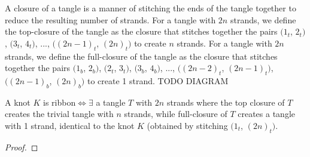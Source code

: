 \begin{paper}
A closure of a tangle is a manner of stitching the ends of the tangle together
to reduce the resulting number of strands.
For a tangle with $2n$ strands, we define the top-closure of the tangle as the
closure that stitches together the pairs $(1_t$, $2_t)$, $(3_t$, $4_t)$, ...,
$((2n-1)_t$, $(2n)_t)$ to create $n$ strands.
For a tangle with $2n$ strands, we define the full-closure of the tangle as the
closure that stitches together the pairs $(1_b$, $2_b)$, $(2_t$, $3_t)$, $(3_b$,
$4_b)$, ..., $((2n-2)_t$, $(2n-1)_t)$, $((2n-1)_b$, $(2n)_b)$ to create 1
strand.
TODO DIAGRAM
\begin{theorem}
A knot $K$ is ribbon$\iff\exists$ a tangle $T$ with $2n$ strands where the top
closure of $T$ creates the trivial tangle with $n$ strands, while full-closure
of $T$ creates a tangle with 1 strand, identical to the knot $K$ (obtained by
stitching $(1_t$, $(2n)_t)$.
\end{theorem}
\begin{proof}
\end{proof}
\end{paper}

